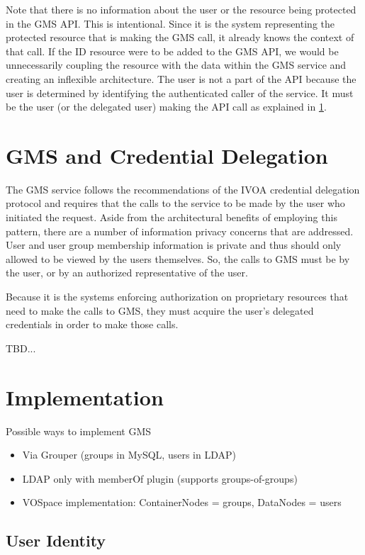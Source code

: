 \documentclass[11pt,a4paper]{ivoa}
\begin{document}
Note that there is no information about the user or the resource being protected in the GMS API.  This is intentional.
Since it is the system representing the protected resource that is making the GMS call, it already knows the context of that call.  If the ID resource were to be added to the GMS API, we would be unnecessarily coupling the resource with the data within the GMS service and creating an inflexible architecture.
The user is not a part of the API because the user is determined by identifying the authenticated caller of the service.  It must be the user (or the delegated user) making the API call as explained in \ref{section:gmsandcdp}.

\section{GMS and Credential Delegation}
\label{section:gmsandcdp}

The GMS service follows the recommendations of the IVOA credential delegation protocol \citep{std:CDP} and requires that the calls to the service to be made by the user who initiated the request.  Aside from the architectural benefits of employing this pattern, there are a number of information privacy concerns that are addressed.  User and user group membership information is private and thus should only allowed to be viewed by the users themselves.  So, the calls to GMS must be by the user, or by an authorized representative of the user.

Because it is the systems enforcing authorization on proprietary resources that need to make the calls to GMS, they must acquire the user's delegated credentials in order to make those calls.  

TBD...


\section {Implementation}

Possible ways to implement GMS

\begin{itemize}
\item Via Grouper (groups in MySQL, users in LDAP)
\item LDAP only with memberOf plugin (supports groups-of-groups)
\item VOSpace implementation: ContainerNodes = groups, DataNodes = users
\end{itemize}

\subsection{User Identity}
\label{subsection:useridentity}
\end{document}

